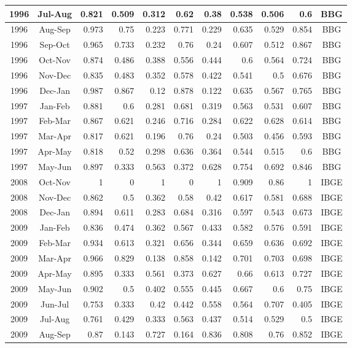 \documentclass[11pt]{article}
\begin{document}
\begin{table}[h]
{\begin{tabular}{|c|c|r|r|r|r|r|r|r|r|c|}
1996 & Jul-Aug & 0.821 & 0.509 & 0.312 & 0.62   & 0.38   & 0.538 & 0.506 & 0.6   & BBG  \\ \hline
1996 & Aug-Sep & 0.973 & 0.75  & 0.223 & 0.771  & 0.229  & 0.635 & 0.529 & 0.854 & BBG  \\ \hline
1996 & Sep-Oct & 0.965 & 0.733 & 0.232 & 0.76   & 0.24   & 0.607 & 0.512 & 0.867 & BBG  \\ \hline
1996 & Oct-Nov & 0.874 & 0.486 & 0.388 & 0.556  & 0.444  & 0.6   & 0.564 & 0.724 & BBG  \\ \hline
1996 & Nov-Dec & 0.835 & 0.483 & 0.352 & 0.578  & 0.422  & 0.541 & 0.5   & 0.676 & BBG  \\ \hline
1996 & Dec-Jan & 0.987 & 0.867 & 0.12  & 0.878  & 0.122  & 0.635 & 0.567 & 0.765 & BBG  \\ \hline
1997 & Jan-Feb & 0.881 & 0.6   & 0.281 & 0.681  & 0.319  & 0.563 & 0.531 & 0.607 & BBG  \\ \hline
1997 & Feb-Mar & 0.867 & 0.621 & 0.246 & 0.716  & 0.284  & 0.622 & 0.628 & 0.614 & BBG  \\ \hline
1997 & Mar-Apr & 0.817 & 0.621 & 0.196 & 0.76   & 0.24   & 0.503 & 0.456 & 0.593 & BBG  \\ \hline
1997 & Apr-May & 0.818 & 0.52  & 0.298 & 0.636  & 0.364  & 0.544 & 0.515 & 0.6   & BBG  \\ \hline
1997 & May-Jun & 0.897 & 0.333 & 0.563 & 0.372  & 0.628  & 0.754 & 0.692 & 0.846 & BBG  \\ \hline
2008 & Oct-Nov & 1     & 0     & 1     & 0      & 1      & 0.909 & 0.86  & 1     & IBGE \\ \hline
2008 & Nov-Dec & 0.862 & 0.5   & 0.362 & 0.58   & 0.42   & 0.617 & 0.581 & 0.688 & IBGE \\ \hline
2008 & Dec-Jan & 0.894 & 0.611 & 0.283 & 0.684  & 0.316  & 0.597 & 0.543 & 0.673 & IBGE \\ \hline
2009 & Jan-Feb & 0.836 & 0.474 & 0.362 & 0.567  & 0.433  & 0.582 & 0.576 & 0.591 & IBGE \\ \hline
2009 & Feb-Mar & 0.934 & 0.613 & 0.321 & 0.656  & 0.344  & 0.659 & 0.636 & 0.692 & IBGE \\ \hline
2009 & Mar-Apr & 0.966 & 0.829 & 0.138 & 0.858  & 0.142  & 0.701 & 0.703 & 0.698 & IBGE \\ \hline
2009 & Apr-May & 0.895 & 0.333 & 0.561 & 0.373  & 0.627  & 0.66  & 0.613 & 0.727 & IBGE \\ \hline
2009 & May-Jun & 0.902 & 0.5   & 0.402 & 0.555  & 0.445  & 0.667 & 0.6   & 0.75  & IBGE \\ \hline
2009 & Jun-Jul & 0.753 & 0.333 & 0.42  & 0.442  & 0.558  & 0.564 & 0.707 & 0.405 & IBGE \\ \hline
2009 & Jul-Aug & 0.761 & 0.429 & 0.333 & 0.563  & 0.437  & 0.514 & 0.529 & 0.5   & IBGE \\ \hline
2009 & Aug-Sep & 0.87  & 0.143 & 0.727 & 0.164  & 0.836  & 0.808 & 0.76  & 0.852 & IBGE \\ \hline
\end{tabular}%
}
\end{table}
\end{document}
